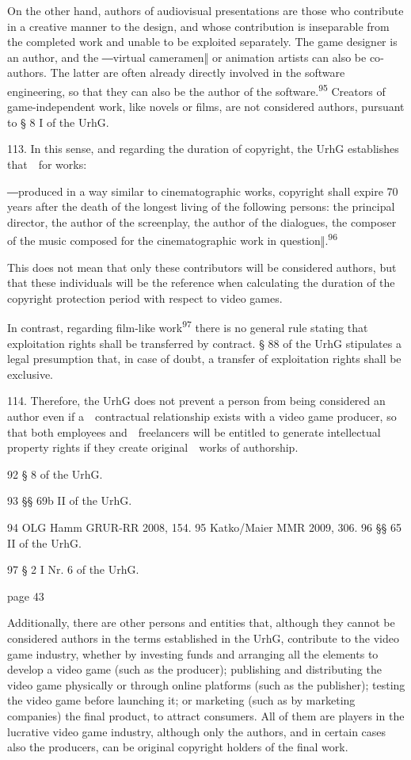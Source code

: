 \documentclass[
]{article}
\begin{document}
{On the other hand, authors of audiovisual presentations are those who
contribute in a creative manner to the design, and whose contribution is
inseparable from the completed work and unable to be exploited
separately. The game designer is an author, and the }{―virtual
cameramen‖ or animation artists can also be co}{-authors. The latter are
often already directly involved in the software engineering, so that
they can also be the author of the software.}\textsuperscript{{95
}}{Creators of game-independent work, like novels or films, are not
considered }{authors}{, pursuant to § 8 I of the }{UrhG}{.}

{113. }{In this sense, and regarding the duration of copyright, the
}{UrhG }{establishes that~~for works:}

{―}{produced in a way similar to cinematographic works, copyright shall
expire 70 years after the death of the longest living of the following
persons: the principal director, the author of the screenplay, the
author of the dialogues, the composer of the music composed for the
cinematographic work in que}{stion‖.}\textsuperscript{{96}}

{This does not mean that only these contributors will be considered
}{authors}{, but that these individuals will be the reference when
calculating the duration of the copyright protection period with respect
to video games.}

{In contrast, regarding film-like work}\textsuperscript{{97 }}{there is
no general rule stating that exploitation rights shall be transferred by
contract. § 88 of the }{UrhG }{stipulates a legal presumption that, in
case of doubt, a transfer of exploitation rights shall be exclusive.}

{114. }{Therefore, the }{UrhG }{does not prevent a person from being
considered an }{author }{even if a~~contractual relationship exists with
a video game producer, so that both employees and~~freelancers will be
entitled to generate intellectual property rights if they create
original~~works of authorship.}

{92 }{§ 8 of the }{UrhG}{.}

{93 }{§§ 69b II of the }{UrhG}{.}

{94 }{OLG Hamm GRUR-RR 2008, 154. }{95 }{Katko/Maier MMR 2009, 306. }{96
}{§§ 65 II of the }{UrhG}{.}

{97 }{§ 2 I Nr. 6 of the }{UrhG}{.}

{page 43}

{Additionally, there are other persons and entities that, although they
cannot be considered authors in the terms established in the }{UrhG}{,
contribute to the video game industry, whether by investing funds and
arranging all the elements to develop a video game (such as the
producer); publishing and distributing the video game physically or
through online platforms (such as the publisher); testing the video game
before launching it; or marketing (such as by marketing companies) the
final product, to attract consumers. All of them are }{players }{in the
lucrative video game industry, although only the authors, and in certain
cases also the producers, can be original copyright holders of the final
work.}
\end{document}
